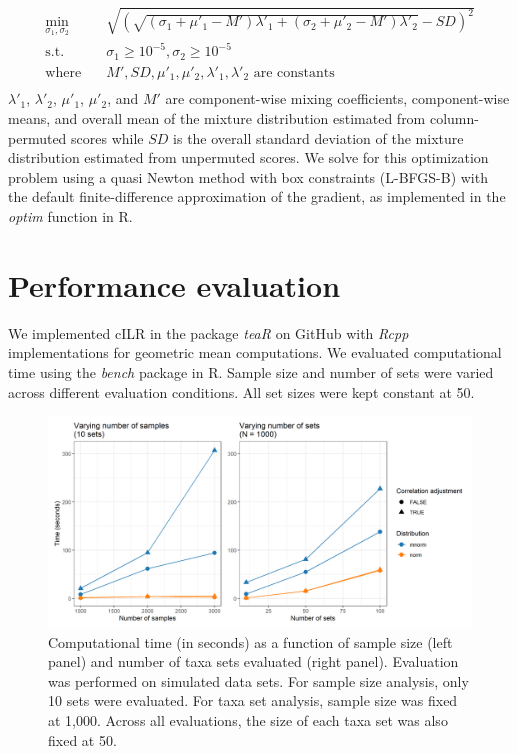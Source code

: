 \documentclass{article}
\begin{document}
\begin{equation} \label{eq:3}
\begin{aligned}
    \min_{\sigma_1, \sigma_2} \quad & \sqrt{\left(\sqrt{(\sigma_1 + \mu'_1 - M')\lambda'_1 + (\sigma_2 + \mu'_2 - M')\lambda'_2} - SD\right)^2}\\
    \textrm{s.t.}  \quad & \sigma_1 \geq 10^{-5}, \sigma_2 \geq 10^{-5}    \\
    \textrm{where} \quad & M', SD, \mu'_1, \mu'_2, \lambda'_1, \lambda'_2 \text{ are constants} \\
\end{aligned}
\end{equation}
$\lambda'_1$, $\lambda'_2$, $\mu'_1$, $\mu'_2$, and $M'$ are component-wise mixing coefficients, component-wise means, and overall mean of the mixture distribution estimated from column-permuted scores while $SD$ is the overall standard deviation of the mixture distribution estimated from unpermuted scores. We solve for this optimization problem using a quasi Newton method with box constraints (L-BFGS-B) with the default finite-difference approximation of the gradient, as implemented in the \emph{optim} function in R.   

\section{Performance evaluation} 
We implemented cILR in the package \emph{teaR} on GitHub with \emph{Rcpp} implementations for geometric mean computations. We evaluated computational time using the \emph{bench} package in R. Sample size and number of sets were varied across different evaluation conditions. All set sizes were kept constant at 50. 

\begin{figure}[!ht]
    \centering
    \includegraphics[width=\textwidth]{figures/performance.png}
    \caption{Computational time (in seconds) as a function of sample size (left panel) and number of taxa sets evaluated (right panel). Evaluation was performed on simulated data sets. For sample size analysis, only 10 sets were evaluated. For taxa set analysis, sample size was fixed at 1,000. Across all evaluations, the size of each taxa set was also fixed at 50.}
    \label{fig:s1}
\end{figure}
\end{document}
